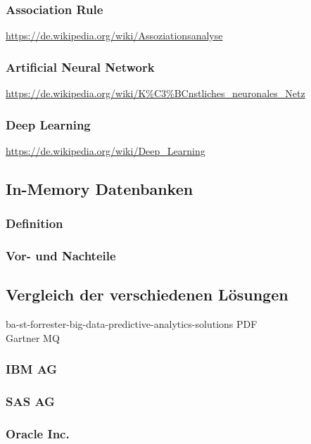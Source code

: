 \subsubsection{Association Rule}
\url{https://de.wikipedia.org/wiki/Assoziationsanalyse}\\

\subsubsection{Artificial Neural Network}
\url{https://de.wikipedia.org/wiki/K%C3%BCnstliches_neuronales_Netz}\\
	
\subsubsection{Deep Learning}
\url{https://de.wikipedia.org/wiki/Deep_Learning}\\

\subsection{In-Memory Datenbanken}

\subsubsection{Definition}

\subsubsection{Vor- und Nachteile}

\subsection{Vergleich der verschiedenen Lösungen}
ba-st-forrester-big-data-predictive-analytics-solutions PDF \\
Gartner MQ\\

\subsubsection{IBM AG}

\subsubsection{SAS AG}

\subsubsection{Oracle Inc.}


